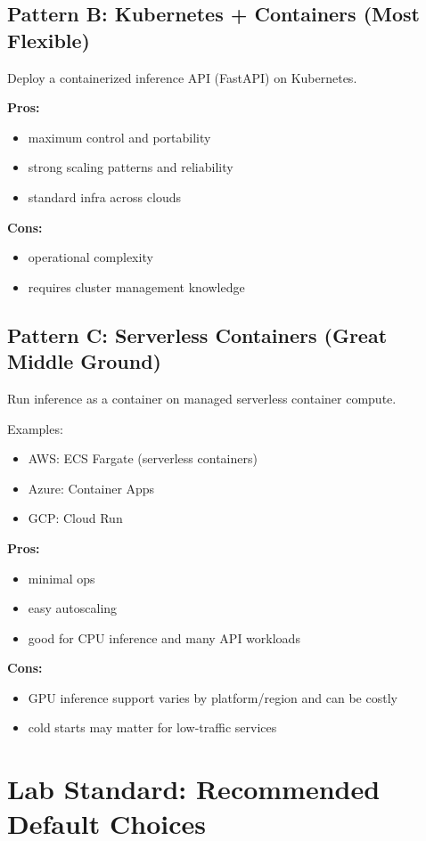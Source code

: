 \documentclass[11pt]{article}
\begin{document}
\subsection{Pattern B: Kubernetes + Containers (Most Flexible)}
Deploy a containerized inference API (FastAPI) on Kubernetes.

\textbf{Pros:}
\begin{itemize}
  \item maximum control and portability
  \item strong scaling patterns and reliability
  \item standard infra across clouds
\end{itemize}

\textbf{Cons:}
\begin{itemize}
  \item operational complexity
  \item requires cluster management knowledge
\end{itemize}

\subsection{Pattern C: Serverless Containers (Great Middle Ground)}
Run inference as a container on managed serverless container compute.

Examples:
\begin{itemize}
  \item AWS: ECS Fargate (serverless containers)
  \item Azure: Container Apps
  \item GCP: Cloud Run
\end{itemize}

\textbf{Pros:}
\begin{itemize}
  \item minimal ops
  \item easy autoscaling
  \item good for CPU inference and many API workloads
\end{itemize}

\textbf{Cons:}
\begin{itemize}
  \item GPU inference support varies by platform/region and can be costly
  \item cold starts may matter for low-traffic services
\end{itemize}

\section{Lab Standard: Recommended Default Choices}
\end{document}
